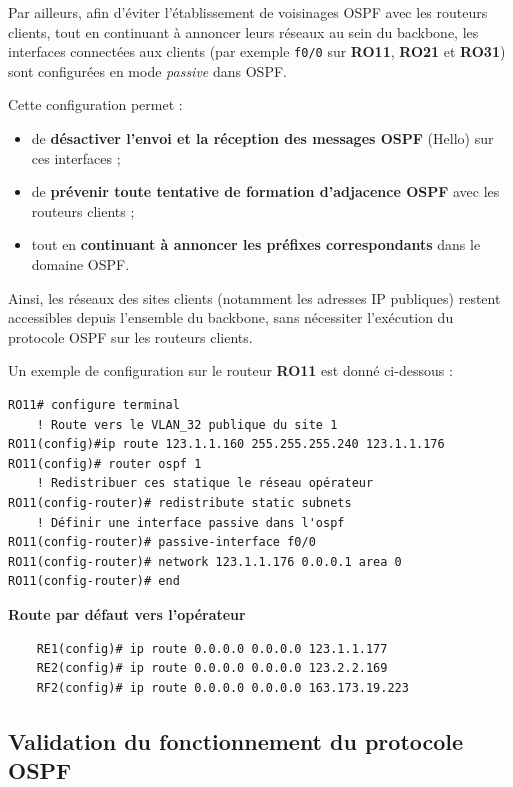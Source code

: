 \documentclass[12pt,a4paper, oneside]{memoir}
\begin{document}
\medskip

Par ailleurs, afin d’éviter l’établissement de voisinages OSPF avec les routeurs clients, tout en continuant à annoncer leurs réseaux au sein du backbone, les interfaces connectées aux clients (par exemple \texttt{f0/0} sur \textbf{RO11}, \textbf{RO21} et \textbf{RO31}) sont configurées en mode \textit{passive} dans OSPF.

Cette configuration permet :
\begin{itemize}
	\item de \textbf{désactiver l’envoi et la réception des messages OSPF} (Hello) sur ces interfaces ;
	\item de \textbf{prévenir toute tentative de formation d’adjacence OSPF} avec les routeurs clients ;
	\item tout en \textbf{continuant à annoncer les préfixes correspondants} dans le domaine OSPF.
\end{itemize}

Ainsi, les réseaux des sites clients (notamment les adresses IP publiques) restent accessibles depuis l’ensemble du backbone, sans nécessiter l’exécution du protocole OSPF sur les routeurs clients.

\medskip

Un exemple de configuration sur le routeur \textbf{RO11} est donné ci-dessous :

\begin{verbatim}
RO11# configure terminal
	! Route vers le VLAN_32 publique du site 1			
RO11(config)#ip route 123.1.1.160 255.255.255.240 123.1.1.176  
RO11(config)# router ospf 1
	! Redistribuer ces statique le réseau opérateur 		
RO11(config-router)# redistribute static subnets 
	! Définir une interface passive dans l'ospf  
RO11(config-router)# passive-interface f0/0   
RO11(config-router)# network 123.1.1.176 0.0.0.1 area 0
RO11(config-router)# end
\end{verbatim}

 \textbf{ Route par défaut vers l’opérateur}
\begin{verbatim}
	RE1(config)# ip route 0.0.0.0 0.0.0.0 123.1.1.177		
	RE2(config)# ip route 0.0.0.0 0.0.0.0 123.2.2.169		
	RF2(config)# ip route 0.0.0.0 0.0.0.0 163.173.19.223			
\end{verbatim}

\subsection{Validation du fonctionnement du protocole OSPF}
\end{document}
